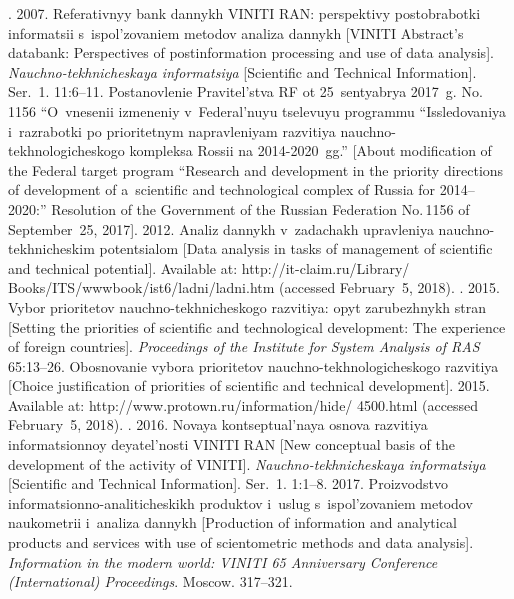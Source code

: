 \begin{multicols}{2}
{{\begin{thebibliography}{99}
    . 2007. Referativnyy bank 
dannykh VINITI RAN: perspektivy postobrabotki informatsii s~ispol'zovaniem 
metodov analiza dannykh  [VINITI Abstract's databank: Perspectives of  
postinformation processing and use of data analysis].  
\textit{Nauchno-tekhnicheskaya informatsiya} [Scientific and Technical 
Information]. Ser.~1. 11:6--11.
    Postanovlenie Pravitel'stva RF ot 25~sentyabrya 2017~g. No.\,1156 
``O~vnesenii izmeneniy v~Federal'nuyu tselevuyu programmu ``Issledovaniya 
i~razrabotki po prioritetnym napravleniyam razvitiya nauchno-tekhnologicheskogo 
kompleksa Rossii na 2014-2020~gg.'' [About modification of the Federal target 
program ``Research and development in the priority directions of development of 
a~scientific and technological complex of Russia for 2014--2020:''  Resolution of the 
Government of the Russian Federation  No.\,1156 of September~25, 2017].
     2012. Analiz dannykh v~zadachakh upravleniya 
nauchno-tekhnicheskim potentsialom [Data analysis  in tasks of management of 
scientific and technical potential]. Available at: {\sf  
http://it-claim.ru/Library/ Books/ITS/wwwbook/ist6/ladni/ladni.htm} (accessed 
February~5, 2018).
    . 2015. Vybor prioritetov nauchno-tekhnicheskogo razvitiya: opyt 
zarubezhnykh stran  [Setting the priorities of scientific and technological development: 
The experience of foreign countries]. \textit{Proceedings of the Institute for
System Analysis of RAS} 
65:13--26.
    Obosnovanie vybora prioritetov nauchno-tekh\-no\-lo\-gi\-che\-sko\-go razvitiya  
[Choice justification of priorities of scientific and technical development]. 2015. 
Available at: {\sf http://www.protown.ru/information/hide/ 4500.html} (accessed 
February~5, 2018).
    . 
2016. Novaya kontseptual'naya osnova razvitiya informatsionnoy deyatel'nosti 
VINITI RAN [New conceptual basis of the development of the activity of \mbox{VINITI}]. 
\textit{Nauchno-tekhnicheskaya informatsiya} [Scientific and Technical 
Information]. Ser.~1. 1:1--8. 
     2017. Proizvodstvo informatsionno-analiticheskikh 
produktov i~uslug s~ispol'zovaniem metodov naukometrii i~analiza dannykh 
[Production of information and analytical products and services with use of 
scientometric methods and data  analysis].  \textit{Information in the 
modern world:  \mbox{VINITI} 65 Anniversary  Conference (International) Proceedings}. 
Moscow. 317--321.
 \end{thebibliography}

 }
 }

\end{multicols}

